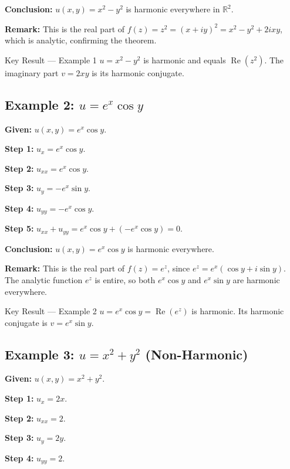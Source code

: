\documentclass[12pt,a4paper]{article}
\begin{document}
\textbf{Conclusion:} $u(x,y)=x^{2}-y^{2}$ is harmonic everywhere in $\mathbb{R}^{2}$.

\textbf{Remark:} This is the real part of $f(z)=z^{2}=(x+iy)^{2}=x^{2}-y^{2}+2ixy$, which is
analytic, confirming the theorem.

\begin{learnbox}{Key Result --- Example 1}
$u=x^{2}-y^{2}$ is harmonic and equals $\operatorname{Re}(z^{2})$. The imaginary part
$v=2xy$ is its harmonic conjugate.
\end{learnbox}

\subsection*{Example 2: $u = e^{x}\cos y$}

\textbf{Given:} $u(x,y)=e^{x}\cos y$.

\textbf{Step 1:} $u_{x} = e^{x}\cos y$.

\textbf{Step 2:} $u_{xx} = e^{x}\cos y$.

\textbf{Step 3:} $u_{y} = -e^{x}\sin y$.

\textbf{Step 4:} $u_{yy} = -e^{x}\cos y$.

\textbf{Step 5:} $u_{xx}+u_{yy} = e^{x}\cos y + (-e^{x}\cos y) = 0$.

\textbf{Conclusion:} $u(x,y)=e^{x}\cos y$ is harmonic everywhere.

\textbf{Remark:} This is the real part of $f(z)=e^{z}$, since $e^{z}=e^{x}(\cos y + i\sin y)$.
The analytic function $e^{z}$ is entire, so both $e^{x}\cos y$ and $e^{x}\sin y$ are harmonic
everywhere.

\begin{learnbox}{Key Result --- Example 2}
$u=e^{x}\cos y = \operatorname{Re}(e^{z})$ is harmonic. Its harmonic conjugate is
$v=e^{x}\sin y$.
\end{learnbox}

\subsection*{Example 3: $u = x^{2}+y^{2}$ (Non-Harmonic)}

\textbf{Given:} $u(x,y)=x^{2}+y^{2}$.

\textbf{Step 1:} $u_{x} = 2x$.

\textbf{Step 2:} $u_{xx} = 2$.

\textbf{Step 3:} $u_{y} = 2y$.

\textbf{Step 4:} $u_{yy} = 2$.
\end{document}
